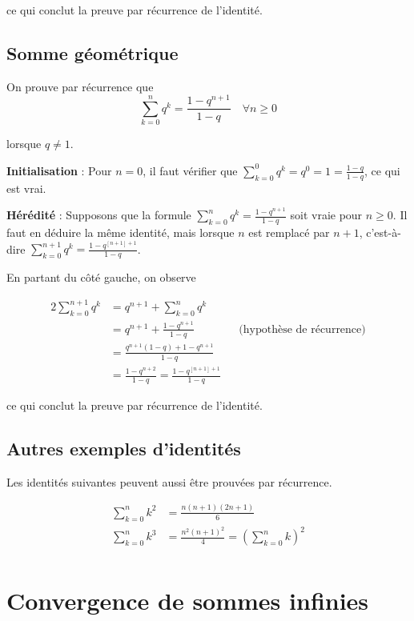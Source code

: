 \documentclass[oneside,11pt,french,table]{book}
\theoremstyle{definition}
\theoremstyle{plain}
\theoremstyle{remark}
\begin{document}
ce qui conclut la preuve par récurrence de l'identité.

\subsection{Somme géométrique}

On prouve par récurrence que 
$$\sum_{k=0}^n q^k = \frac{1-q^{n+1}}{1-q} \quad \forall n \geq 0$$

lorsque $q \neq 1$.

\textbf{Initialisation} : Pour $n = 0$, il faut vérifier que  $\sum_{k=0}^0 q^k = q^0 = 1 = \frac{1-q}{1-q}$, ce qui est vrai.

\textbf{Hérédité} : Supposons que la formule $\sum_{k=0}^n q^k = \frac{1-q^{n+1}}{1-q}$ soit vraie pour $n \geq 0$. Il faut en déduire la même identité, mais lorsque $n$ est remplacé par $n+1$, c'est-à-dire $\sum_{k=0}^{n+1} q^k = \frac{1-q^{[n+1]+1}}{1-q}$. 

En partant du côté gauche, on observe

\begin{alignat*}{2}
    \sum_{k=0}^{n+1} q^k &= q^{n+1} + \sum_{k=0}^{n} q^k && \\
    &= q^{n+1} + \frac{1-q^{n+1}}{1-q} && \text{(hypothèse de récurrence)} \\
    &= \frac{q^{n+1}(1-q) + 1-q^{n+1}}{1-q} && \\
    &= \frac{1-q^{n+2}}{1-q} = \frac{1-q^{[n+1]+1}}{1-q} 
\end{alignat*}

ce qui conclut la preuve par récurrence de l'identité.

\subsection{Autres exemples d'identités}

Les identités suivantes peuvent aussi être prouvées par récurrence.

\begin{align*}
   \sum_{k=0}^n k^2 &= \frac{n(n+1)(2n+1)}{6} \\
\sum_{k=0}^n k^3 &= \frac{n^2(n+1)^2}{4} = \left( \sum_{k=0}^n k \right)^2 \\
\end{align*}

\section{Convergence de sommes infinies}
\end{document}
